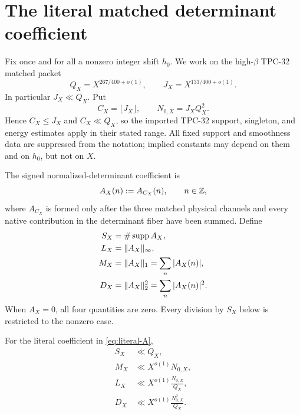 \section{The literal matched determinant coefficient}
\label{sec:literal-coefficient}

Fix once and for all a nonzero integer shift \(h_0\).  We work on
the high-\(\beta\) TPC-32 matched packet
\begin{equation}
 Q_X=X^{267/400+o(1)},\qquad
 J_X=X^{133/400+o(1)}.
\label{eq:high-beta-scales}
\end{equation}
In particular \(J_X\ll Q_X\).  Put
\begin{equation}
 C_X=\lfloor J_X\rfloor,\qquad
 N_{0,X}=J_XQ_X^2.
\label{eq:matched-scales}
\end{equation}
Hence \(C_X\le J_X\) and \(C_X\ll Q_X\), so the imported TPC-32
support, singleton, and energy estimates apply in their stated
range.
All fixed support and smoothness data are suppressed from the
notation; implied constants may depend on them and on \(h_0\), but
not on \(X\).

The signed normalized-determinant coefficient is
\begin{equation}
 A_X(n):=A_{C_X}(n),\qquad n\in\mathbb Z,
\label{eq:literal-A}
\end{equation}
where \(A_{C_X}\) is formed only after the three matched physical
channels and every native contribution in the determinant fiber have
been summed.  Define
\begin{equation}
\begin{aligned}
 S_X&=\#\operatorname{supp} A_X,\\
 L_X&=\|A_X\|_\infty,\\
 M_X&=\|A_X\|_1=\sum_n|A_X(n)|,\\
 D_X&=\|A_X\|_2^2=\sum_n|A_X(n)|^2.
\end{aligned}
\label{eq:SLMD}
\end{equation}
When \(A_X=0\), all four quantities are zero.  Every division by
\(S_X\) below is restricted to the nonzero case.

\begin{proposition}
\label{prop:tpc32-envelope}
For the literal coefficient in \eqref{eq:literal-A},
\begin{align}
 S_X&\ll Q_X,\label{eq:support-upper}\\
 M_X&\ll X^{o(1)}N_{0,X},\label{eq:mass-upper}\\
 L_X&\ll
 X^{o(1)}\frac{N_{0,X}}{Q_X},\label{eq:atom-upper}\\
 D_X&\ll
 X^{o(1)}\frac{N_{0,X}^2}{Q_X}.
\label{eq:energy-upper}
\end{align}
\end{proposition}

